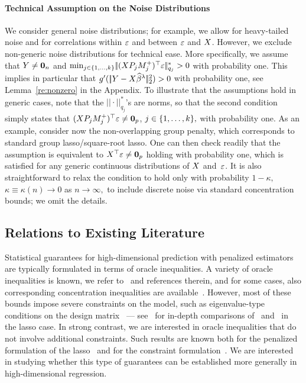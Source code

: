 \documentclass[bj]{imsart}
\newcommand{\normtwo}[1]{\ensuremath{\!|\!| #1 | \! |_{2}}}
\newcommand{\norm}[1]{\ensuremath{\!|\!| #1 | \! |}}
\newcommand{\1}{{\rm 1}\mskip -4,5mu{\rm l} }
\begin{document}
\paragraph{Technical Assumption on the Noise Distributions} We consider general noise distributions; for example, we allow for heavy-tailed noise and for correlations within $\textcolor{black}{\varepsilon}$ and between $\textcolor{black}{\varepsilon}$ and $\textcolor{black}{X}$. However, we exclude non-generic noise distributions for technical ease. More specifically, we assume that $\textcolor{black}{Y}\neq \bold{0}_n$ and $\min_{j\in\{1,\dots,\numbergroups\}}\norm{(\design \projectionmatrix_j\fusedmatrix_j^{+})^\top\noise}_{q_j}^*>0$ with probability one. This implies in particular that $\linkfunction'(\,\normtwo{Y-X\estimatort}^2)>0$ with probability one, see Lemma~\ref{re:nonzero} in the Appendix. To illustrate that the assumptions hold in generic cases, note that the $\norm{\cdot}_{q_j}^*$'s are norms, so that the second condition simply states that $(\textcolor{black}{X} P_jM_j^{+})^\top\textcolor{black}{\varepsilon}\neq {\bf 0}_p$, $j\in\{1,\dots,k\},$ with probability one. As an example, consider now the non-overlapping group penalty, which corresponds to standard group lasso/square-root lasso. One can then check readily that the  assumption is equivalent to $\textcolor{black}{X}^\top\textcolor{black}{\varepsilon}\neq {\bf 0}_p$ holding with probability one, which is satisfied for any generic continuous distributions of $\textcolor{black}{X}$ and~$\textcolor{black}{\varepsilon}$. It is also straightforward to relax the condition to hold only with probability $1-\kappa,$ $\kappa\equiv \kappa(n)\to 0$ as $n\to\infty,$ to include discrete noise via standard concentration bounds; we omit the details.\label{endnotesign}

\subsection*{Relations to Existing Literature}
Statistical guarantees for high-dimensional prediction with penalized estimators  are typically formulated in terms of oracle inequalities. A variety of oracle inequalities is known, we refer to~\cite{Buhlmann13b,Buhlmann11,Hastie15} and references therein, and for some cases, also corresponding concentration inequalities are available~\cite[Theorem~1.1]{Chatterjee14}. However, most of these bounds impose severe constraints on the model, such as eigenvalue-type conditions on the design matrix~\cite{Bunea_Tsybakov_Wegkamp07,vandeGeer07} --- see~\cite{ArnakMoYo14,Hebiri13} for in-depth comparisons of \pbos\ and \sbos\ in the lasso case. In strong contrast, we are interested in oracle inequalities that do not involve additional constraints. Such results are known both for the penalized formulation of the lasso~\cite{MM11,Kolt10,RigTsy11} and for the constraint formulation~\cite{Chatterjee13}. We are interested in studying whether this type of guarantees can be established more generally in high-dimensional regression.
\end{document}
